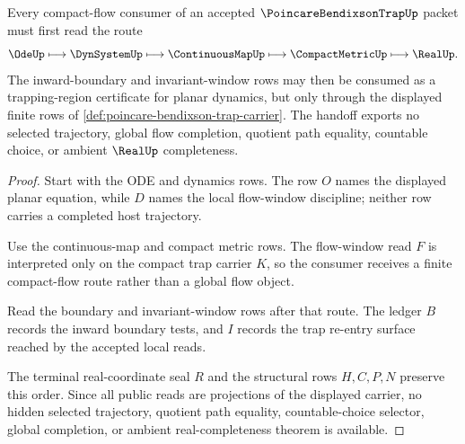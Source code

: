 \begin{theorem}
\label{thm:poincare-bendixson-trap-compact-flow-handoff}
Every compact-flow consumer of an accepted $\PoincareBendixsonTrapUp$ packet must first read the route
$$
\OdeUp \longmapsto \DynSystemUp \longmapsto \ContinuousMapUp \longmapsto \CompactMetricUp \longmapsto \RealUp .
$$
The inward-boundary and invariant-window rows may then be consumed as a trapping-region certificate for planar dynamics, but only through the displayed finite rows of \autoref{def:poincare-bendixson-trap-carrier}. The handoff exports no selected trajectory, global flow completion, quotient path equality, countable choice, or ambient $\RealUp$ completeness.
\end{theorem}
\begin{proof}
Start with the ODE and dynamics rows. The row $O$ names the displayed planar equation, while $D$ names the local flow-window discipline; neither row carries a completed host trajectory.

Use the continuous-map and compact metric rows. The flow-window read $F$ is interpreted only on the compact trap carrier $K$, so the consumer receives a finite compact-flow route rather than a global flow object.

Read the boundary and invariant-window rows after that route. The ledger $B$ records the inward boundary tests, and $I$ records the trap re-entry surface reached by the accepted local reads.

The terminal real-coordinate seal $R$ and the structural rows $H,C,P,N$ preserve this order. Since all public reads are projections of the displayed carrier, no hidden selected trajectory, quotient path equality, countable-choice selector, global completion, or ambient real-completeness theorem is available.
\end{proof}



